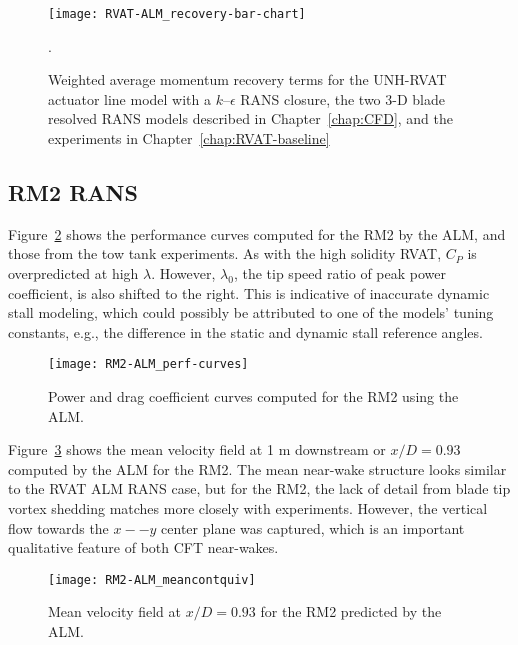 \begin{figure}
    \centering
    
    \texttt{[image: RVAT-ALM\_recovery-bar-chart]}

    \caption{Weighted average momentum recovery terms for the UNH-RVAT actuator
        line model with a $k$--$\epsilon$ RANS closure, the two 3-D blade resolved
        RANS models described in Chapter~\ref{chap:CFD}, and the experiments in
        Chapter~\ref{chap:RVAT-baseline}}.
    
    \label{fig:RVAT-ALM-recovery}
\end{figure}


\subsection{RM2 RANS}

Figure~\ref{fig:RM2-ALM-perf-curves} shows the performance curves computed for
the RM2 by the ALM, and those from the tow tank experiments. As with the high
solidity RVAT, $C_P$ is overpredicted at high $\lambda$. However, $\lambda_0$,
the tip speed ratio of peak power coefficient, is also shifted to the right.
This is indicative of inaccurate dynamic stall modeling, which could possibly be
attributed to one of the models' tuning constants, e.g., the difference in the
static and dynamic stall reference angles. 

\begin{figure}
    \centering
    
    \texttt{[image: RM2-ALM\_perf-curves]}
    
    \caption{Power and drag coefficient curves computed for the RM2 using the
        ALM.}
    
    \label{fig:RM2-ALM-perf-curves}
\end{figure}

Figure~\ref{fig:RM2-ALM-meancontquiv} shows the mean velocity field at 1 m
downstream or $x/D=0.93$ computed by the ALM for the RM2. The mean near-wake
structure looks similar to the RVAT ALM RANS case, but for the RM2, the lack of
detail from blade tip vortex shedding matches more closely with experiments.
However, the vertical flow towards the $x--y$ center plane was captured, which
is an important qualitative feature of both CFT near-wakes.

\begin{figure}
    \centering
    
    \texttt{[image: RM2-ALM\_meancontquiv]}
    
    \caption{Mean velocity field at $x/D=0.93$ for the RM2 predicted by the
        ALM.}
    
    \label{fig:RM2-ALM-meancontquiv}
\end{figure}


